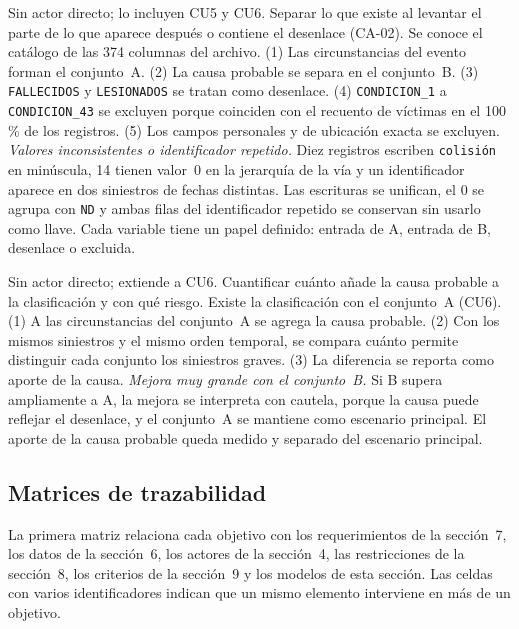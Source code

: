 {Sin actor directo; lo incluyen CU5 y CU6.}
{Separar lo que existe al levantar el parte de lo que aparece después o contiene el desenlace (CA-02).}
{Se conoce el catálogo de las 374 columnas del archivo.}
{(1) Las circunstancias del evento forman el conjunto~A. (2) La causa probable se separa en el conjunto~B. (3) \texttt{FALLECIDOS} y \texttt{LESIONADOS} se tratan como desenlace. (4) \texttt{CONDICION\_1} a \texttt{CONDICION\_43} se excluyen porque coinciden con el recuento de víctimas en el 100\,\% de los registros. (5) Los campos personales y de ubicación exacta se excluyen.}
{\emph{Valores inconsistentes o identificador repetido.} Diez registros escriben \texttt{colisión} en minúscula, 14 tienen valor~0 en la jerarquía de la vía y un identificador aparece en dos siniestros de fechas distintas. Las escrituras se unifican, el 0 se agrupa con \texttt{ND} y ambas filas del identificador repetido se conservan sin usarlo como llave.}
{Cada variable tiene un papel definido: entrada de A, entrada de B, desenlace o excluida.}

{Sin actor directo; extiende a CU6.}
{Cuantificar cuánto añade la causa probable a la clasificación y con qué riesgo.}
{Existe la clasificación con el conjunto~A (CU6).}
{(1) A las circunstancias del conjunto~A se agrega la causa probable. (2) Con los mismos siniestros y el mismo orden temporal, se compara cuánto permite distinguir cada conjunto los siniestros graves. (3) La diferencia se reporta como aporte de la causa.}
{\emph{Mejora muy grande con el conjunto~B.} Si B supera ampliamente a A, la mejora se interpreta con cautela, porque la causa puede reflejar el desenlace, y el conjunto~A se mantiene como escenario principal.}
{El aporte de la causa probable queda medido y separado del escenario principal.}

\subsection{Matrices de trazabilidad}
\label{sec:trazabilidad}

La primera matriz relaciona cada objetivo con los requerimientos de la sección~7, los datos de la sección~6, los actores de la sección~4, las restricciones de la sección~8, los criterios de la sección~9 y los modelos de esta sección. Las celdas con varios identificadores indican que un mismo elemento interviene en más de un objetivo.

